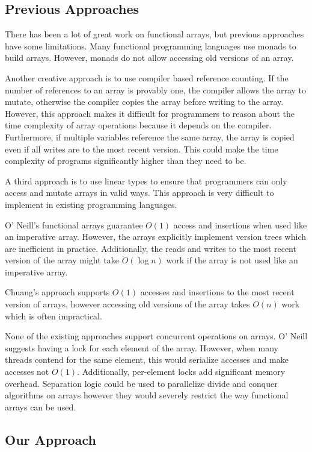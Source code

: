 \documentclass[preprint]{sigplanconf}
\begin{document}
\subsection{Previous Approaches}

There has been a lot of great work on functional arrays, but previous approaches have some limitations. Many functional programming languages use monads to build arrays. However, monads do not allow accessing old versions of an array.

Another creative approach is to use compiler based reference counting. If the number of references to an array is provably one, the compiler allows the array to mutate, otherwise the compiler copies the array before writing to the array. However, this approach makes it difficult for programmers to reason about the time complexity of array operations because it depends on the compiler. Furthermore, if multiple variables reference the same array, the array is copied even if all writes are to the most recent version. This could make the time complexity of programs significantly higher than they need to be.

A third approach is to use linear types to ensure that programmers can only access and mutate arrays in valid ways. This approach is very difficult to implement in existing programming languages.

O' Neill's functional arrays guarantee $O(1)$ access and insertions when used like an imperative array. However, the arrays explicitly implement version trees which are inefficient in practice. Additionally, the reads and writes to the most recent version of the array might take $O(\log{n})$ work if the array is not used like an imperative array.

Chuang's approach supports $O(1)$ accesses and insertions to the most recent version of arrays, however accessing old versions of the array takes $O(n)$ work which is often impractical.

None of the existing approaches support concurrent operations on arrays. O' Neill suggests having a lock for each element of the array. However, when many threads contend for the same element, this would serialize accesses and make accesses not $O(1)$. Additionally, per-element locks add significant memory overhead. Separation logic could be used to parallelize divide and conquer algorithms on arrays however they would severely restrict the way functional arrays can be used.

\subsection{Our Approach}
\end{document}
